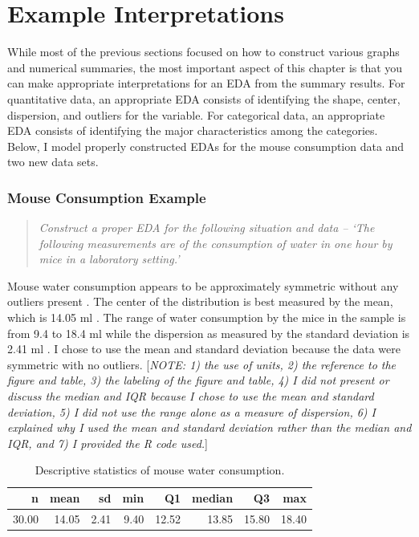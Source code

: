\documentclass[10pt,openany]{book}\usepackage[]{graphicx}\usepackage[]{color}
\begin{document}
\section{Example Interpretations}
While most of the previous sections focused on how to construct various graphs and numerical summaries, the most important aspect of this chapter is that you can make appropriate interpretations for an EDA from the summary results.  For quantitative data, an appropriate EDA consists of identifying the shape, center, dispersion, and outliers for the variable.  For categorical data, an appropriate EDA consists of identifying the major characteristics among the categories.  Below, I model properly constructed EDAs for the mouse consumption data and two new data sets.

\subsubsection{Mouse Consumption Example}
\begin{quote}
\textit{Construct a proper EDA for the following situation and data -- `The  following measurements  are of the consumption of water in one hour by mice in a laboratory setting.'}
\end{quote}


Mouse water consumption appears to be approximately symmetric without any outliers present .  The center of the distribution is best measured by the mean, which is 14.05 ml .  The range of water consumption by the mice in the sample is from 9.4 to 18.4 ml while the dispersion as measured by the standard deviation is 2.41 ml .  I chose to use the mean and standard deviation because the data were symmetric with no outliers.  [\textit{NOTE: 1) the use of units, 2) the reference to the figure and table, 3) the labeling of the figure and table, 4) I did not present or discuss the median and IQR because I chose to use the mean and standard deviation, 5) I did not use the range alone as a measure of dispersion, 6) I explained why I used the mean and standard deviation rather than the median and IQR, and 7) I provided the R code used.}]

\begin{table}[ht]
\centering
\caption{Descriptive statistics of mouse water consumption.} 
\label{tab:MouseStats}
\begin{tabular}{rrrrrrrr}
  \hline
n & mean & sd & min & Q1 & median & Q3 & max \\ 
  \hline
30.00 & 14.05 & 2.41 & 9.40 & 12.52 & 13.85 & 15.80 & 18.40 \\ 
   \hline
\end{tabular}
\end{table}
\end{document}
